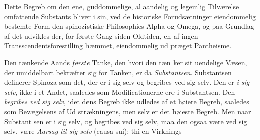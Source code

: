 \documentclass[12pt,a4paper]{book}
\begin{document}
Dette Begreb om den ene, guddommelige, al aandelig og
legemlig Tilværelse omfattende Substants bliver i sin, ved de
historiske Forudsætninger eiendommelig bestemte Form den
spinozistiske Philosophies Alpha og Omega, og paa Grundlag
af det udvikles der, for første Gang siden Oldtiden, en af
ingen Transscendentsforestilling hæmmet, eiendommelig ud\-%
præget Pantheisme.

Den tænkende Aands \emph{første} Tanke, den hvori den tæn\-%
ker sit uendelige Væsen, der umiddelbart bekræfter sig for
Tanken, er da \emph{Substantsen}. Substantsen definerer Spinoza
som det, der er i sig selv og begribes ved sig selv. Den er
\emph{i sig selv}, ikke i et Andet, saaledes som Modificationerne ere
i Substantsen. Den \emph{begribes ved sig selv}, idet dens Begreb
ikke udledes af et høiere Begreb, saaledes som Bevægelsens af Ud\-%
strækningens, men selv er det høieste Begreb. Men naar Substant\-%
sen er i sig selv, og begribes ved sig selv, maa den ogsaa være ved
sig selv, være \emph{Aarsag til sig selv} (causa sui); thi en Virknings
\end{document}
